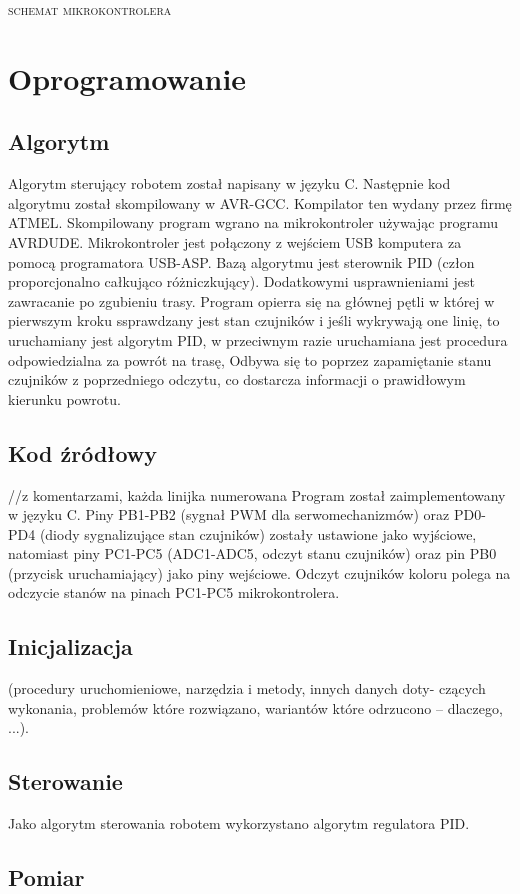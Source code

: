 \documentclass[11pt,a4paper]{article}
\begin{document}
  \textsc{schemat mikrokontrolera}

\section{Oprogramowanie}
  \subsection{Algorytm}
  Algorytm sterujący robotem został napisany w języku C. Następnie kod algorytmu został skompilowany w AVR-GCC. Kompilator ten wydany przez firmę ATMEL. Skompilowany program wgrano na mikrokontroler używając programu AVRDUDE. Mikrokontroler jest połączony z wejściem USB komputera za pomocą programatora USB-ASP. 
  Bazą algorytmu jest sterownik PID (człon proporcjonalno całkująco różniczkujący). Dodatkowymi usprawnieniami jest zawracanie po zgubieniu trasy. Program opierra się na głównej pętli w której w pierwszym kroku ssprawdzany jest stan czujników i jeśli wykrywają one linię, to uruchamiany jest algorytm PID, w przeciwnym razie uruchamiana jest procedura odpowiedzialna za powrót na trasę, Odbywa się to poprzez zapamiętanie stanu czujników z poprzedniego odczytu, co dostarcza informacji o prawidłowym kierunku powrotu.

  \subsection{Kod źródłowy}
//z komentarzami, każda linijka numerowana
  Program został zaimplementowany w języku C. Piny PB1-PB2 (sygnał PWM dla serwomechanizmów) oraz PD0-PD4 (diody sygnalizujące stan czujników) zostały ustawione jako wyjściowe, natomiast piny PC1-PC5 (ADC1-ADC5, odczyt stanu czujników) oraz pin PB0 (przycisk uruchamiający) jako piny wejściowe. Odczyt czujników koloru polega na odczycie stanów na pinach PC1-PC5 mikrokontrolera.
  \subsection{Inicjalizacja} (procedury uruchomieniowe, narzędzia i metody, innych danych doty-
czących wykonania, problemów które rozwiązano, wariantów które odrzucono – dlaczego,
...).
  \subsection{Sterowanie}
  Jako algorytm sterowania robotem wykorzystano algorytm regulatora PID.
  \subsection{Pomiar}  
  
\end{document}
